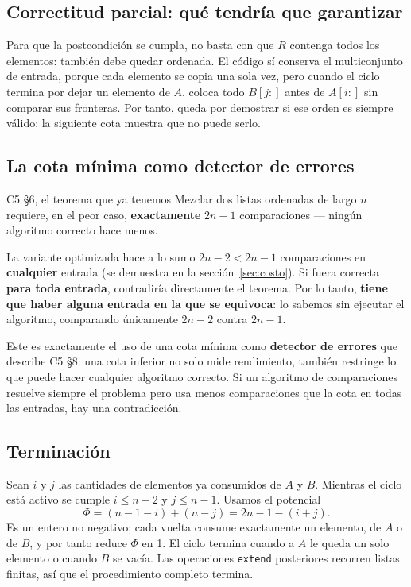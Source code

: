 \documentclass[11pt]{article}
\begin{document}
\subsection*{Correctitud parcial: qué tendría que garantizar}

Para que la postcondición se cumpla, no basta con que $R$ contenga todos los elementos: también debe quedar
ordenada. El código sí conserva el multiconjunto de entrada, porque cada elemento se copia una sola vez,
pero cuando el ciclo termina por dejar un elemento de $A$, coloca todo $B[j:]$ antes de $A[i:]$ sin comparar
sus fronteras. Por tanto, queda por demostrar si ese orden es siempre válido; la siguiente cota muestra que
no puede serlo.

\subsection*{La cota mínima como detector de errores}

\begin{resultado}{C5 §6, el teorema que ya tenemos}
Mezclar dos listas ordenadas de largo $n$ requiere, en el peor caso, \textbf{exactamente} $2n-1$
comparaciones --- ningún algoritmo correcto hace menos.
\end{resultado}

La variante optimizada hace a lo sumo $2n{-}2<2n{-}1$ comparaciones en \textbf{cualquier} entrada (se demuestra
en la sección~\ref{sec:costo}). Si fuera
correcta \textbf{para toda entrada}, contradiría directamente el teorema. Por lo tanto, \textbf{tiene que
haber alguna entrada en la que se equivoca}: lo sabemos sin ejecutar el algoritmo, comparando únicamente
$2n{-}2$ contra $2n{-}1$.

Este es exactamente el uso de una cota mínima como \textbf{detector de errores} que describe C5 §8: una cota
inferior no solo mide rendimiento, también restringe lo que puede hacer cualquier algoritmo correcto. Si un
algoritmo de comparaciones resuelve siempre el problema pero usa menos comparaciones que la cota en todas las
entradas, hay una contradicción.

\subsection*{Terminación}

Sean $i$ y $j$ las cantidades de elementos ya consumidos de $A$ y $B$. Mientras el ciclo está activo se
cumple $i\le n-2$ y $j\le n-1$. Usamos el potencial
\[
\Phi=(n-1-i)+(n-j)=2n-1-(i+j).
\]
Es un entero no negativo; cada vuelta consume exactamente un elemento, de $A$ o de $B$, y por tanto reduce
$\Phi$ en 1. El ciclo termina cuando a $A$ le queda un solo elemento o cuando $B$ se vacía. Las operaciones
\texttt{extend} posteriores recorren listas finitas, así que el procedimiento completo termina.
\end{document}

